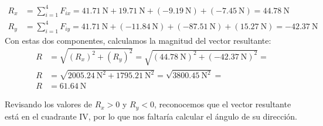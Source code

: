 \documentclass[14pt]{extarticle}
\begin{document}
\begin{align*}
R_{x} &= \sum_{i=1}^{4} F_{ix} = \SI{41.71}{\newton} + \SI{19.71}{\newton} + (-\SI{9.19}{\newton}) + (-\SI{7.45}{\newton}) = \SI{44.78}{\newton} \\[0.75em]
R_{y} &= \sum_{i=1}^{4} F_{iy} = \SI{41.71}{\newton} + (-\SI{11.84}{\newton}) + (-\SI{87.51}{\newton}) + (\SI{15.27}{\newton}) = -\SI{42.37}{\newton}
\end{align*}
Con estas dos componentes, calculamos la magnitud del vector resultante:
\begin{align*}
R &= \sqrt{(R_{x})^{2} + (R_{y})^{2}} = \sqrt{(\SI{44.78}{\newton})^{2} + (-\SI{42.37}{\newton})^{2}} = \\[0.5em]
R &= \sqrt{\SI{2005.24}{\square\newton} + \SI{1795.21}{\square\newton}} = \sqrt{\SI{3800.45}{\square\newton}} = \\[0.5em]
R &= \SI{61.64}{\newton}
\end{align*}

Revisando los valores de $R_{x} > 0$ y $R_{y} < 0$, reconocemos que el vector resultante está en el cuadrante IV, por lo que nos faltaría calcular el ángulo de su dirección.
\end{document}
